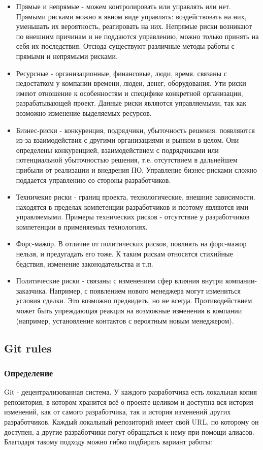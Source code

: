\begin{itemize}
    \item Прямые и непрямые - можем контролировать или управлять или нет. Прямыми рисками можно в явном виде управлять: воздействовать на них, уменьшать их вероятность, реагировать на них. Непрямые риски возникают по внешним причинам и не поддаются управлению, можно только принять на себя их последствия. Отсюда существуют различные методы работы с прямыми и непрямыми рисками.
    \item Ресурсные - организационные, финансовые, люди, время. связаны с недостатком у компании времени, людеи, денег, оборудования. Ути риски имеют отношение к особенностям и специфике конкретной организации, разрабатывающей проект. Данные риски являются управляемыми, так как возможно изменение выделяемых ресурсов.
    \item Бизнес-риски - конкуренция, подрядчики, убыточность решения. появляются из-за взаимодействия с другими организациями и рынком в целом. Они определены конкуренцией, взаимодействием с подрядчиками или потенциальной убыточностью решения, т.е. отсутствием в дальнейшем прибыли от реализации и внедрения ПО. Управление бизнес-рисками сложно поддается управлению со стороны разработчиков.
    \item Техничекие риски - границ проекта, технологические, внешние зависимости. находятся в пределах компетенции разработчиков и поэтому являются ими управляемыми. Примеры технических рисков - отсутствие у разработчиков компетенции в применяемых технологиях.
    \item Форс-мажор. В отличие от политических рисков, повлиять на форс-мажор нельзя, и предугадать его тоже. К таким рискам относятся стихийные бедствия, изменение законодательства и т.п.
    \item Политические риски - связаны с изменением сфер влияния внутри компании-заказчика.
    Например, с появлением нового менеджера могут измениться условия сделки. Это возможно предвидеть, но не всегда. Противодействием может быть упреждающая реакция на возможные изменения в компании (например, установление контактов с вероятным новым менеджером).
\end{itemize}

\subsection{Git rules}

\subsubsection{Определение}
Git - децентрализованная система. У каждого разработчика есть локальная копия репозитория, в котором хранится всё о проекте целиком и доступна вся история изменений, как от самого разработчика, так и история изменений других разработчиков.
Каждый локальный репозиторий имеет свой URL, по которому он доступен, а другие разработчики погут обращаться к нему при помощи алиасов. 
Благодаря такому подходу можно гибко подбирать вариант работы: 

